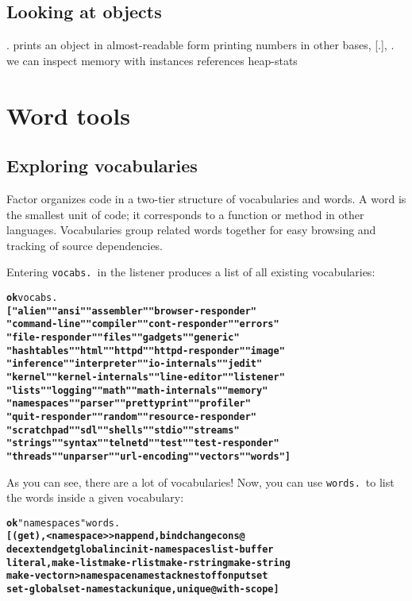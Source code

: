\documentclass{article}
\begin{document}
\subsection{Looking at objects}

. prints an object in almost-readable form
printing numbers in other bases, [.], {.}
we can inspect memory with  instances references heap-stats

\section{Word tools}

\subsection{Exploring vocabularies}

Factor organizes code in a two-tier structure of vocabularies and words. A word is the smallest unit of code; it corresponds to a function or method in other languages. Vocabularies group related words together for easy browsing and tracking of source dependencies.

Entering \texttt{vocabs.}~in the listener produces a list of all existing vocabularies:

\begin{alltt}
\textbf{ok} vocabs.
\textbf{[ "alien" "ansi" "assembler" "browser-responder"
"command-line" "compiler" "cont-responder" "errors"
"file-responder" "files" "gadgets" "generic"
"hashtables" "html" "httpd" "httpd-responder" "image"
"inference" "interpreter" "io-internals" "jedit"
"kernel" "kernel-internals" "line-editor" "listener"
"lists" "logging" "math" "math-internals" "memory"
"namespaces" "parser" "prettyprint" "profiler"
"quit-responder" "random" "resource-responder"
"scratchpad" "sdl" "shells" "stdio" "streams"
"strings" "syntax" "telnetd" "test" "test-responder"
"threads" "unparser" "url-encoding" "vectors" "words" ]}
\end{alltt}

As you can see, there are a lot of vocabularies! Now, you can use \texttt{words.}~to list the words inside a given vocabulary:

\begin{alltt}
\textbf{ok} "namespaces" words.
\textbf{[ (get) , <namespace> >n append, bind change cons@
dec extend get global inc init-namespaces list-buffer
literal, make-list make-rlist make-rstring make-string
make-vector n> namespace namestack nest off on put set
set-global set-namestack unique, unique@ with-scope ]}
\end{alltt}
\end{document}

